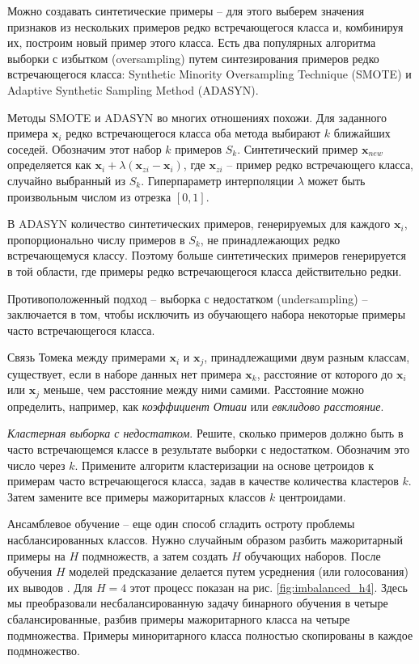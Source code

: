 \documentclass[%
	11pt,
	a4paper,
	utf8,
		]{article}
\begin{document}
Можно создавать синтетические примеры -- для этого выберем значения признаков из нескольких примеров редко встречающегося класса и, комбинируя их, построим новый пример этого класса. Есть два популярных алгоритма выборки с избытком (oversampling) путем синтезирования примеров редко встречающегося класса: Synthetic Minority Oversampling Technique (SMOTE) и Adaptive Synthetic Sampling Method (ADASYN).

Методы SMOTE и ADASYN во многих отношениях похожи. Для заданного примера $ \mathbf{x}_i $ редко встречающегося класса оба метода выбирают $ k $ ближайших соседей. Обозначим этот набор $ k $ примеров $ S_k $. Синтетический пример $ \mathbf{x}_{new} $ определяется как $ \mathbf{x}_i + \lambda (\mathbf{x}_{zi} - \mathbf{x}_i) $, где $ \mathbf{x}_{zi} $ -- пример редко встречающего класса, случайно выбранный из $ S_k $. Гиперпараметр интерполяции $ \lambda $ может быть произвольным числом из отрезка $ [0, 1] $.

В ADASYN количество синтетических примеров, генерируемых для каждого $ \mathbf{x}_i $, пропорционально числу примеров в $ S_k $, не принадлежающих редко встречающемуся классу. Поэтому больше синтетических примеров генерируется в той области, где примеры редко встречающегося класса действительно редки.

Противоположенный подход -- выборка с недостатком (undersampling) -- заключается в том, чтобы исключить из обучающего набора некоторые примеры часто встречающегося класса.

Связь Томека между примерами $ \mathbf{x}_i $ и $ \mathbf{x}_j $, принадлежащими двум разным классам, существует, если в наборе данных нет примера $ \mathbf{x}_k $, расстояние от которого до $ \mathbf{x}_i $ или $ \mathbf{x}_j $ меньше, чем расстояние между ними самими. Расстояние можно определить, например, как \emph{коэффициент Отиаи} или \emph{евклидово расстояние}.

\emph{Кластерная выборка с недостатком}. Решите, сколько примеров должно быть в часто встречающемся классе в результате выборки с недостатком. Обозначим это число через $ k $. Примените алгоритм кластеризации на основе цетроидов к примерам часто встречающегося класса, задав в качестве количества кластеров $ k $. Затем замените все примеры мажоритарных классов $ k $ центроидами. 

Ансамблевое обучение -- еще один способ сгладить остроту проблемы насблансированных классов. Нужно случайным образом разбить мажоритарный примеры на $ H $ подмножеств, а затем создать $ H $ обучающих наборов. После обучения $ H $ моделей предсказание делается путем усреднения (или голосования) их выводов \cite[]{burkov-engineer:2022}. Для $ H = 4 $ этот процесс показан на рис. \ref{fig:imbalanced_h4}. Здесь мы преобразовали несбалансированную задачу бинарного обучения в четыре сбалансированные, разбив примеры мажоритарного класса на четыре подмножества. Примеры миноритарного класса полностью скопированы в каждое подмножество.
\end{document}
